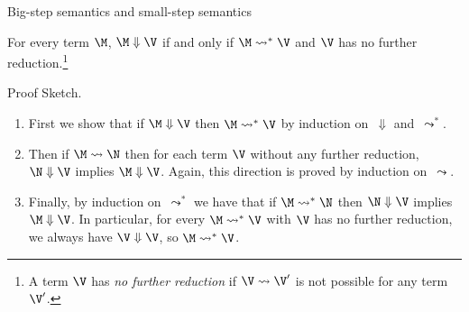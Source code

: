 \begin{frame}{Big-step semantics and small-step semantics}
  \begin{theorem}
    For every term $\M$, $\M \Downarrow \V$ if and only if $ \M \leadsto^* \V$
    and $\V$ has no further reduction.\footnote{
      A term $\V$ has \emph{no further reduction} if $\V \leadsto \V'$ is
      not possible for any term $\V'$.}
  \end{theorem}
  \begin{block}{Proof Sketch.}
    \begin{enumerate}
      \item First we show that if $\M\Downarrow \V$ then $\M \leadsto^* \V$
        by induction on~$\Downarrow$ and~$\leadsto^*$. 
      \item Then if $\M\leadsto\N$ then for each term $\V$ without any further
        reduction, $\N\Downarrow \V$ implies $\M\Downarrow\V$. Again, this
        direction is proved by induction on~$\leadsto$. 
      \item Finally, by induction on~$\leadsto^*$ we have that if $\M\leadsto^*
        \N$ then $\N\Downarrow \V$ implies $\M \Downarrow \V$. In particular, 
        for every $\M \leadsto^* \V$ with $\V$ has no further reduction, we always have
        $\V\Downarrow \V$, so $\M\leadsto^* \V$.
    \end{enumerate}
  \end{block}
\end{frame}

